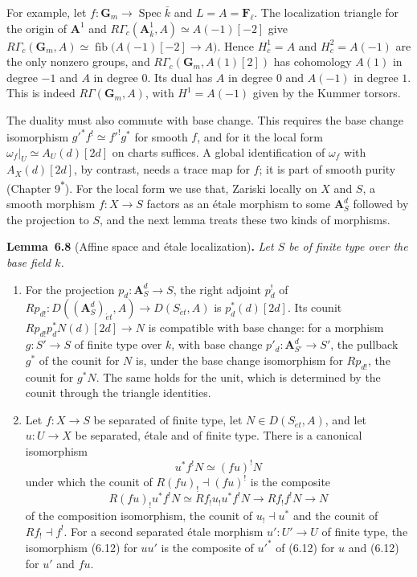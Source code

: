 \documentclass[11pt]{article}
\newenvironment{bpstatement}[2]{\par\addvspace{0.6\baselineskip}\noindent\textbf{#1}#2\textbf{.}\enspace\ignorespaces}
  {\par\addvspace{0.4\baselineskip}}
\newenvironment{bpstatementit}[2]{\begin{bpstatement}{#1}{#2}\itshape\ignorespaces}{\end{bpstatement}}
\newcommand{\bpout}[1]{#1\textsuperscript{\hyperlink{bp-outside}{\ensuremath{\ast}}}}
\providecommand{\Fell}{}\renewcommand{\Fell}{\mathbf F_\ell}
\providecommand{\fib}{}\renewcommand{\fib}{\operatorname{fib}}
\begin{document}
For example, let \(f:\mathbf G_m\to\operatorname{Spec}\bar k\) and \(L=A=\Fell\). The localization triangle for the origin of \(\mathbf A^1\) and \(R\Gamma_c(\mathbf A^1_{\bar k},A)\simeq A(-1)[-2]\) give \(R\Gamma_c(\mathbf G_m,A)\simeq\fib\bigl(A(-1)[-2]\to A\bigr)\). Hence \(H^1_c=A\) and \(H^2_c=A(-1)\) are the only nonzero groups, and \(R\Gamma_c(\mathbf G_m,A(1)[2])\) has cohomology \(A(1)\) in degree \(-1\) and \(A\) in degree \(0\). Its dual has \(A\) in degree \(0\) and \(A(-1)\) in degree \(1\). This is indeed \(R\Gamma(\mathbf G_m,A)\), with \(H^1=A(-1)\) given by the Kummer torsors.

The duality must also commute with base change. This requires the base change isomorphism \(g'^*f^!\simeq f'^!g^*\) for smooth \(f\), and for it the local form \(\omega_f|_U\simeq A_U(d)[2d]\) on charts suffices. A global identification of \(\omega_f\) with \(A_X(d)[2d]\), by contrast, needs a trace map for \(f\); it is part of smooth purity (Chapter \bpout{9}). For the local form we use that, Zariski locally on \(X\) and \(S\), a smooth morphism \(f:X\to S\) factors as an étale morphism to some \(\mathbf A^d_S\) followed by the projection to \(S\), and the next lemma treats these two kinds of morphisms.

\label{bp26}%
\begin{bpstatementit}{Lemma~6.8}{ (Affine space and étale localization)}
Let \(S\) be of finite type over the base field \(k\).

\begin{enumerate}
\item For the projection \(p_d:\mathbf A^d_S\to S\), the right adjoint \(p_d^!\) of \(Rp_{d!}:D((\mathbf A^d_S)_{\acute{e}t},A)
\to D(S_{\acute{e}t},A)\) is \(p_d^*(d)[2d]\). Its counit \(Rp_{d!}p_d^*N(d)[2d]\to N\) is compatible with base change: for a morphism \(g:S'\to S\) of finite type over \(k\), with base change \(p'_d:\mathbf A^d_{S'}\to S'\), the pullback \(g^*\) of the counit for \(N\) is, under the base change isomorphism for \(Rp_{d!}\), the counit for \(g^*N\). The same holds for the unit, which is determined by the counit through the triangle identities.
\item Let \(f:X\to S\) be separated of finite type, let \(N\in D(S_{\acute{e}t},A)\), and let \(u:U\to X\) be separated, étale and of finite type. There is a canonical isomorphism \[
   u^*f^!N\simeq(fu)^!N
   \tag{6.12}
   \] under which the counit of \(R(fu)_!\dashv(fu)^!\) is the composite \[
   R(fu)_!u^*f^!N\simeq Rf_!u_!u^*f^!N\longrightarrow Rf_!f^!N
   \longrightarrow N
   \] of the composition isomorphism, the counit of \(u_!\dashv u^*\) and the counit of \(Rf_!\dashv f^!\). For a second separated étale morphism \(u':U'\to U\) of finite type, the isomorphism (6.12) for \(uu'\) is the composite of \(u'^*\) of (6.12) for \(u\) and (6.12) for \(u'\) and \(fu\).
\end{enumerate}
\end{bpstatementit}
\end{document}
